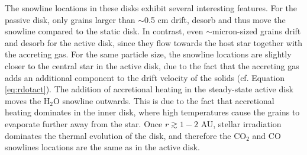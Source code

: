 \documentclass[apj]{emulateapj}
\begin{document}


The snowline locations in these disks exhibit several interesting features. For the passive disk, only grains larger than $\sim$0.5 cm drift, desorb and thus move the snowline compared to the static disk. In contrast, even $\sim$micron-sized grains drift and desorb for the active disk, since they flow towards the host star together with the accreting gas. For the same particle size, the snowline locations are slightly closer to the central star in the active disk, due to the fact that the accreting gas adds an additional component to the drift velocity of the solids (cf. Equation \ref{eq:rdotact}). The addition of accretional heating in the steady-state active disk moves the H$_2$O snowline outwards. This is due to the fact that accretional heating dominates in the inner disk, where high temperatures cause the grains to evaporate further away from the star. Once $r\gtrsim1-2$  AU, stellar irradiation dominates the thermal evolution of the disk, and therefore the CO$_2$ and CO snowlines locations are the same as in the active disk. 
\end{document}
